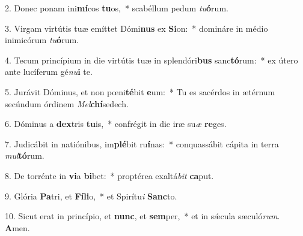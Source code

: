 2. Donec ponam ini\textbf{mí}cos \textbf{tu}os,~*  scabéllum pedum \textit{tu}\textbf{ó}rum.\

3. Virgam virtútis tuæ emíttet Dómi\textbf{nus} ex \textbf{Si}on:~*  domináre in médio inimicórum \textit{tu}\textbf{ó}rum.\

4. Tecum princípium in die virtútis tuæ in splendóri\textbf{bus} sanc\textbf{tó}rum:~*  ex útero ante lucíferum gé\textit{nu}\textbf{i} te.\

5. Jurávit Dóminus, et non pœni\textbf{té}bit \textbf{e}um:~*  Tu es sacérdos in ætérnum secúndum órdinem \textit{Mel}\textbf{chí}sedech.\

6. Dóminus a \textbf{dex}tris \textbf{tu}is,~*  confrégit in die iræ su\textit{æ} \textbf{re}ges.\

7. Judicábit in natiónibus, im\textbf{plé}bit ru\textbf{í}nas:~*  conquassábit cápita in terra \textit{mul}\textbf{tó}rum.\

8. De torrénte in \textbf{vi}a \textbf{bi}bet:~*  proptérea exaltá\textit{bit} \textbf{ca}put.\

9. Glória \textbf{Pa}tri, et \textbf{Fí}\textbf{li}o,~*  et Spirítu\textit{i} \textbf{Sanc}to.\

10. Sicut erat in princípio, et \textbf{nunc}, et \textbf{sem}per,~*  et in sǽcula sæculó\textit{rum}. \textbf{A}men.\

